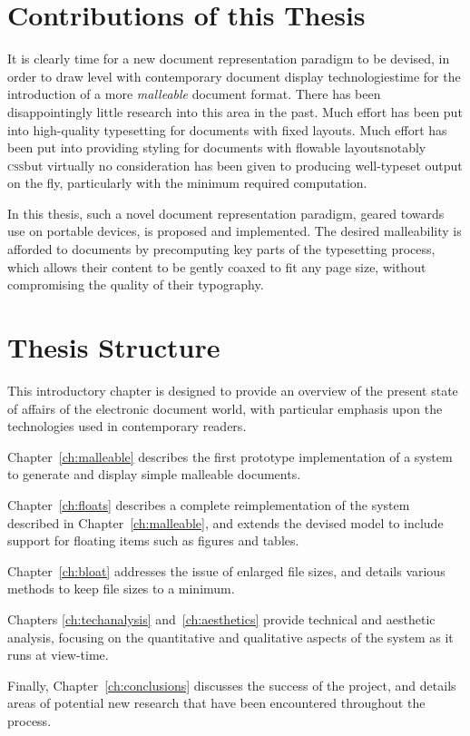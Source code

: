 \section{Contributions of this Thesis}

It is clearly time for a new document representation paradigm to be devised, in order to draw level with contemporary document display technologies\ed time for the introduction of a more \emph{malleable} document format. There has been disappointingly little research into this area in the past. Much effort has been put into high-quality typesetting for documents with fixed layouts. Much effort has been put into providing styling for documents with flowable layouts\ed notably \textsc{css}\ed but virtually no consideration has been given to producing well-typeset output on the fly, particularly with the minimum required computation.

In this thesis, such a novel document representation paradigm, geared towards use on portable devices, is proposed and implemented. The desired malleability is afforded to documents by precomputing key parts of the typesetting process, which allows their content to be gently coaxed to fit any page size, without compromising the quality of their typography.



\section{Thesis Structure}

This introductory chapter is designed to provide an overview of the present state of affairs of the electronic document world, with particular emphasis upon the technologies used in contemporary \ebook{} readers. 

Chapter~\ref{ch:malleable} describes the first prototype implementation of a system to generate and display simple malleable documents.

Chapter~\ref{ch:floats} describes a complete reimplementation of the system described in Chapter~\ref{ch:malleable}, and extends the devised model to include support for floating items such as figures and tables.

Chapter~\ref{ch:bloat} addresses the issue of enlarged file sizes, and details various methods to keep file sizes to a minimum.

Chapters \ref{ch:techanalysis} and~\ref{ch:aesthetics} provide technical and aesthetic analysis, focusing on the quantitative and qualitative aspects of the system as it runs at view-time.

Finally, Chapter~\ref{ch:conclusions} discusses the success of the project, and details areas of potential new research that have been encountered throughout the process.